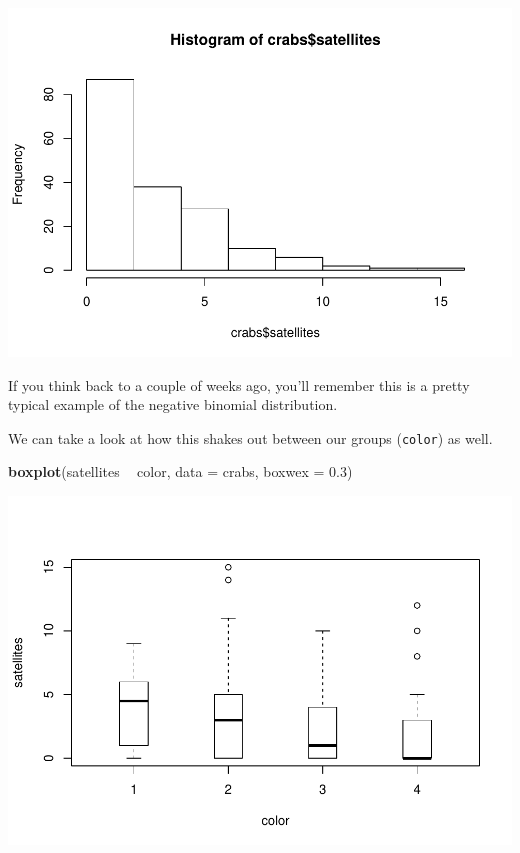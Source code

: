 \documentclass[
]{book}
\newenvironment{Shaded}{\begin{snugshade}}{\end{snugshade}}
\newcommand{\DataTypeTok}[1]{\textcolor[rgb]{0.13,0.29,0.53}{#1}}
\newcommand{\FloatTok}[1]{\textcolor[rgb]{0.00,0.00,0.81}{#1}}
\newcommand{\KeywordTok}[1]{\textcolor[rgb]{0.13,0.29,0.53}{\textbf{#1}}}
\newcommand{\NormalTok}[1]{#1}
\newcommand{\OperatorTok}[1]{\textcolor[rgb]{0.81,0.36,0.00}{\textbf{#1}}}
\newcommand{\StringTok}[1]{\textcolor[rgb]{0.31,0.60,0.02}{#1}}
\begin{document}
\includegraphics{worstr_files/figure-latex/unnamed-chunk-354-1.pdf}

If you think back to a couple of weeks ago, you'll remember this is a pretty typical example of the negative binomial distribution.

We can take a look at how this shakes out between our groups (\texttt{color}) as well.

\begin{Shaded}
\begin{Highlighting}[]
\KeywordTok{boxplot}\NormalTok{(satellites }\OperatorTok{~}\StringTok{ }\NormalTok{color, }\DataTypeTok{data =}\NormalTok{ crabs, }\DataTypeTok{boxwex =} \FloatTok{0.3}\NormalTok{)}
\end{Highlighting}
\end{Shaded}

\includegraphics{worstr_files/figure-latex/unnamed-chunk-355-1.pdf}
\end{document}
